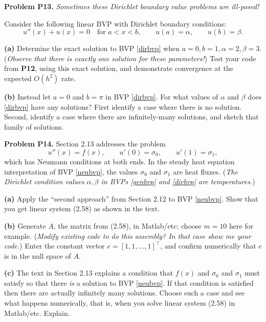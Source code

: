 \documentclass[12pt]{amsart}
\newcommand{\prob}[1]{\bigskip\noindent\textbf{#1}\quad }
\newcommand{\epart}[1]{\medskip\noindent\textbf{(#1)}\quad }
\begin{document}
\prob{Problem P13.}  \emph{Sometimes these Dirichlet boundary value problems are ill-posed!}

\smallskip
\noindent Consider the following linear BVP with Dirichlet boundary conditions:
\begin{equation}
u''(x) +  u(x) = 0 \quad \text{for $a< x< b$}, \qquad u(a)=\alpha, \qquad u(b)=\beta.  \label{dirbvp}
\end{equation}

\epart{a} Determine the exact solution to BVP \eqref{dirbvp} when $a = 0, b = 1, \alpha = 2, \beta = 3$.  (\emph{Observe that there is exactly one solution for these parameters!})  Test your code from \textbf{P12}, using this exact solution, and demonstrate convergence at the expected $O(h^2)$ rate.  

\epart{b} Instead let $a=0$ and $b=\pi$ in BVP \eqref{dirbvp}.  For what values of $\alpha$ and $\beta$ does \eqref{dirbvp} have any solutions?  First identify a case where there is no solution.  Second, identify a case where there are infinitely-many solutions, and sketch that family of solutions.


\prob{Problem P14.}  Section 2.13 addresses the problem
\begin{equation}
u''(x) = f(x), \qquad u'(0)=\sigma_0, \qquad u'(1)=\sigma_1,  \label{neubvp}
\end{equation}
which has Neumann conditions at both ends.  In the steady heat equation interpretation of BVP \eqref{neubvp}, the values $\sigma_0$ and $\sigma_1$ are heat fluxes.  (\emph{The Dirichlet condition values $\alpha,\beta$ in BVPs \eqref{genbvp} and \eqref{dirbvp} are temperatures.})

\epart{a} Apply the ``second approach'' from Section 2.12 to BVP \eqref{neubvp}.  Show that you get linear system (2.58) as shown in the text.

\epart{b} Generate $A$, the matrix from (2.58), in Matlab/etc; choose $m=10$ here for example.  (\emph{Modify existing code to do this assembly?  In that case show me your code.})  Enter the constant vector $e=[1,1,\dots,1]^\top$, and confirm numerically that $e$ is in the null space of $A$.

\epart{c} The text in Section 2.13 explains a condition that $f(x)$ and $\sigma_0$ and $\sigma_1$ must satisfy so that there \emph{is} a solution to BVP \eqref{neubvp}.  If that condition is satisfied then there are actually infinitely many solutions.  Choose such a case and see what happens numerically, that is, when you solve linear system (2.58) in Matlab/etc.  Explain.
\end{document}
